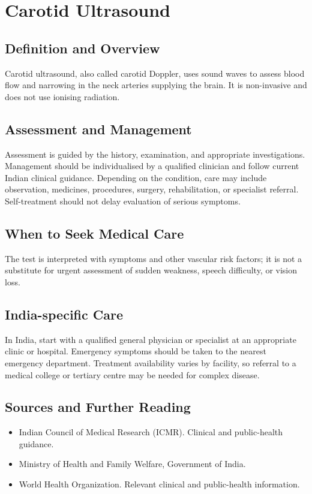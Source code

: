 \chapter{Carotid Ultrasound}

\section*{Definition and Overview}
Carotid ultrasound, also called carotid Doppler, uses sound waves to assess blood flow and narrowing in the neck arteries supplying the brain. It is non-invasive and does not use ionising radiation.

\section*{Assessment and Management}
Assessment is guided by the history, examination, and appropriate investigations. Management should be individualised by a qualified clinician and follow current Indian clinical guidance. Depending on the condition, care may include observation, medicines, procedures, surgery, rehabilitation, or specialist referral. Self-treatment should not delay evaluation of serious symptoms.

\section*{When to Seek Medical Care}
The test is interpreted with symptoms and other vascular risk factors; it is not a substitute for urgent assessment of sudden weakness, speech difficulty, or vision loss.

\section*{India-specific Care}
In India, start with a qualified general physician or specialist at an appropriate clinic or hospital. Emergency symptoms should be taken to the nearest emergency department. Treatment availability varies by facility, so referral to a medical college or tertiary centre may be needed for complex disease.

\section*{Sources and Further Reading}
\begin{itemize}
    \item Indian Council of Medical Research (ICMR). Clinical and public-health guidance.
    \item Ministry of Health and Family Welfare, Government of India.
    \item World Health Organization. Relevant clinical and public-health information.
\end{itemize}

